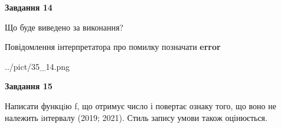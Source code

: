 \documentclass[11pt, ukrainian]{article}
\begin{document}
{\begin {large}
{\begin {center}\textbf{Завдання 14}\end {center}}\par
Що буде виведено за виконання? \par
Повідомлення інтерпретатора про помилку позначати \textbf{error}

\begin{center}
	{../pict/35_14.png}
\end{center}
\newpage

{\begin {center}\textbf{Завдання 15}\end {center}}\par

Написати функцiю f, що отримує число і повертає ознаку того, що воно не належить iнтервалу (2019; 2021). Стиль запису умови також оцінюється.\par
\newpage

\end {large}}
\end{document}
